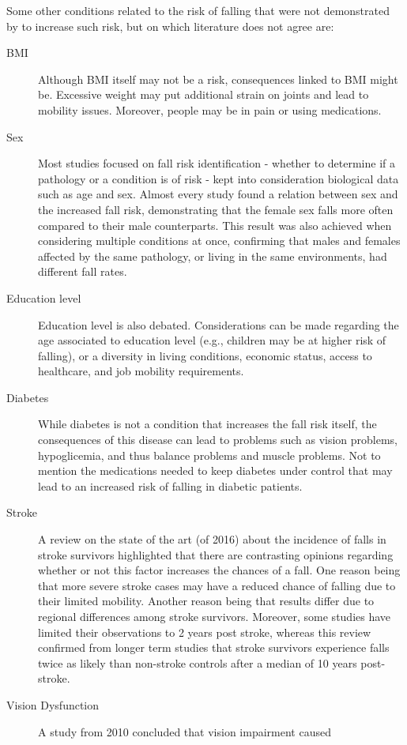 Some other conditions related to the risk of falling that were not demonstrated by \cite{RiskFactors} to increase such risk, but on which literature does not agree are:
\begin{description}
  \item[BMI] Although BMI itself may not be a risk, consequences linked to BMI might be. Excessive weight may put additional strain on joints and lead to mobility issues. Moreover, people may be in pain or using medications.
  \item[Sex] Most studies focused on fall risk identification - whether to determine if a pathology or a condition is of risk - kept into consideration biological data such as age and sex. Almost every study found a relation between sex and the increased fall risk, demonstrating that the female sex falls more often compared to their male counterparts. This result was also achieved when considering multiple conditions at once, confirming that males and females affected by the same pathology, or living in the same environments, had different fall rates.
  \item[Education level] Education level is also debated. Considerations can be made regarding the age associated to education level (e.g., children may be at higher risk of falling), or a diversity in living conditions, economic status, access to healthcare, and job mobility requirements.
  \item[Diabetes] While diabetes is not a condition that increases the fall risk itself, the consequences of this disease can lead to problems such as vision problems, hypoglicemia, and thus balance problems and muscle problems. Not to mention the medications needed to keep diabetes under control that may lead to an increased risk of falling in diabetic patients.
  \item[Stroke] A review on the state of the art (of 2016) about the incidence of falls in stroke survivors \cite{StrokeRisk} highlighted that there are contrasting opinions regarding whether or not this factor increases the chances of a fall. One reason being that more severe stroke cases may have a reduced chance of falling due to their limited mobility. Another reason being that results differ due to regional differences among stroke survivors. Moreover, some studies have limited their observations to 2 years post stroke, whereas this review confirmed from longer term studies that stroke survivors  experience falls twice as likely than non-stroke controls after a median of 10 years post-stroke. 
  \item[Vision Dysfunction] A study from 2010 \cite{VisionRisk} concluded that vision impairment caused 

\end{description}
